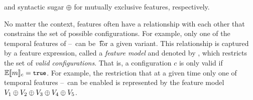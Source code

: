 and syntactic sugar $\oplus$ for mutually exclusive features, respectively.
%

No matter the context, features often have a relationship with each other that
constrains the set of possible configurations. For example, only one of the
temporal features of \vOne--\vFive\ can be \t\ for a given variant. This
relationship is captured by a feature expression, called a \emph{feature model}
and denoted by \fModel, which restricts the set of \emph{valid configurations}.
That is, a configuration $c$ is only valid if $\fSem{\fModel}=\t$.
%
For example, the restriction that at a given time only one of temporal features
\vOne--\vFive\ 
can be enabled is represented by the feature model
$\vOne \oplus \vTwo \oplus \vThree \oplus \vFour \oplus \vFive$.




%


